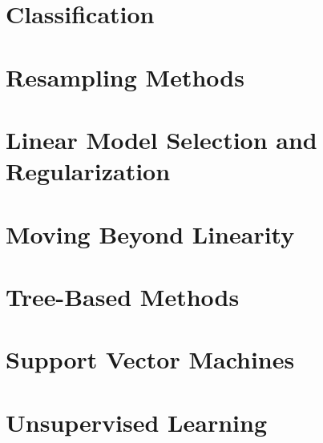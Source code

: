 \documentclass[a4paper,12pt,titlepage]{article} %
\begin{document}
\section{Classification}


\newpage
\section{Resampling Methods}


\newpage
\section{Linear Model Selection and Regularization}


\newpage
\section{Moving Beyond Linearity}


\newpage
\section{Tree-Based Methods}


\newpage
\section{Support Vector Machines}


\newpage
\section{Unsupervised Learning}


\newpage
\listoftables

\newpage
\listoffigures

\end{document}
